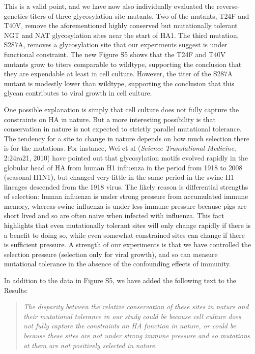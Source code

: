 \documentclass[11pt, oneside]{article}   	%
\newcommand{\response}[1]{{\color{black}#1}}
\begin{document}
\response{This is a valid point, and we have now also individually evaluated the reverse-genetics titers of three glycosylation site mutants.
Two of the mutants, T24F and T40V, remove the aforementioned highly conserved but mutationally tolerant NGT and NAT glycosylation sites near the start of HA1.
The third mutation, S287A, removes a glycosylation site that our experiments suggest is under functional constraint.
The new Figure S5 shows that the T24F and T40V mutants grow to titers comparable to wildtype, supporting the conclusion that they are expendable at least in cell culture. 
However, the titer of the S287A mutant is modestly lower than wildtype, supporting the conclusion that this glycan contributes to viral growth in cell culture.

One possible explanation is simply that cell culture does not fully capture the constraints on HA in nature.
But a more interesting possibility is that conservation in nature is not expected to strictly parallel mutational tolerance.
The tendency for a site to change in nature depends on how much selection there is for the mutations.
For instance, Wei et al (\textit{Science Translational Medicine}, 2:24ra21, 2010) have pointed out that glycosylation motifs evolved rapidly in the globular head of HA from human H1 influenza in the period from 1918 to 2008 (seasonal H1N1), but changed very little in the same period in the swine H1 lineages descended from the 1918 virus.
The likely reason is differential strengths of selection: human influenza is under strong pressure from accumulated immune memory, whereas swine influenza is under less immune pressure because pigs are short lived and so are often naive when infected with influenza.
This fact highlights that even mutationally tolerant sites will only change rapidly if there is a benefit to doing so, while even somewhat constrained sites can change if there is sufficient pressure.
A strength of our experiments is that we have controlled the selection pressure (selection only for viral growth), and so can measure mutational tolerance in the absence of the confounding effects of immunity.

In addition to the data in Figure S5, we have added the following text to the Results:

\begin{quote}
\textsl{
The disparity between the relative conservation of these sites in nature and their mutational tolerance in our study could be because cell culture does not fully capture the constraints on HA function in nature, or could be because these sites are not under strong immune pressure and so mutations at them are not positively selected in nature.}
\end{quote}
}
\end{document}
